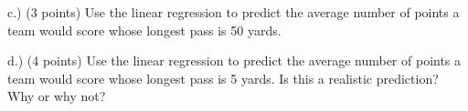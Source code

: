 \documentclass[11pt]{article}
\begin{document}
\begin{questions}
c.) (3 points)   Use the linear regression to predict the average number of points a team would score whose longest pass is 50 yards.
\vspace{1in}


d.) (4 points) Use the linear regression to predict the average number of points a team would score whose longest pass is 5 yards.  Is this a realistic prediction?  Why or why not?
\vspace{1in}





\mbox{}
\end{questions}
\end{document}
